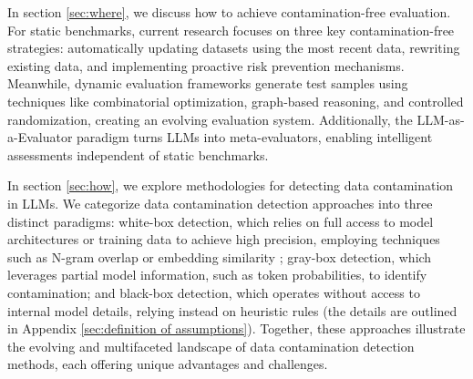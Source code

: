 In section \ref{sec:where}, we discuss how to achieve contamination-free evaluation. For static benchmarks, current research focuses on three key contamination-free strategies: automatically updating datasets using the most recent data, rewriting existing data, and implementing proactive risk prevention mechanisms. Meanwhile, dynamic evaluation frameworks\cite{zhu2024dyvaldynamicevaluationlarge,lei-etal-2024-s3eval,zhang2024darg,ying2024automating} generate test samples using techniques like combinatorial optimization, graph-based reasoning, and controlled randomization, creating an evolving evaluation system. Additionally, the LLM-as-a-Evaluator paradigm\cite{bai2024benchmarking} turns LLMs into meta-evaluators, enabling intelligent assessments independent of static benchmarks.

In section \ref{sec:how}, we explore methodologies for detecting data contamination in LLMs. We categorize data contamination detection approaches into three distinct paradigms: white-box detection, which relies on full access to model architectures or training data to achieve high precision, employing techniques such as N-gram overlap \cite{brown2020language} or embedding similarity \cite{reimers2019sentence}; gray-box detection, which leverages partial model information, such as token probabilities, to identify contamination; and black-box detection, which operates without access to internal model details, relying instead on heuristic rules (the details are outlined in Appendix \ref{sec:definition of assumptions}). Together, these approaches illustrate the evolving and multifaceted landscape of data contamination detection methods, each offering unique advantages and challenges.


